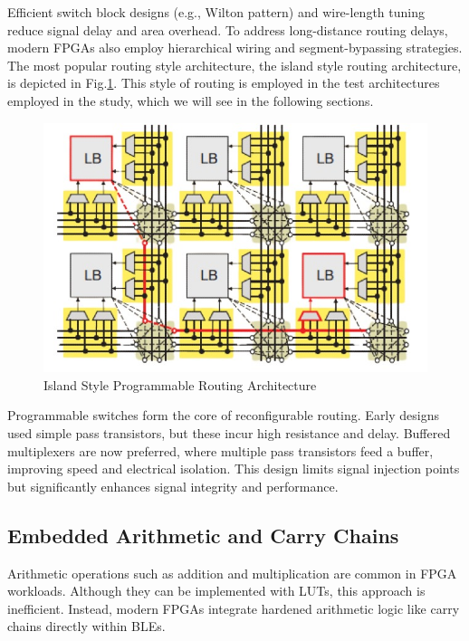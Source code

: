 Efficient switch block designs (e.g., Wilton pattern) and wire-length tuning reduce signal delay and area overhead\cite{funda-fpga-arch-4}. To address long-distance routing delays, modern FPGAs also employ hierarchical wiring and segment-bypassing strategies. The most popular routing style architecture, the island style routing architecture, is depicted in Fig.\ref{fig:island style routing architecture}. This style of routing is employed in the test architectures employed in the study, which we will see in the following sections.

\begin{figure}[H]
	\centerline{\includegraphics[scale = 0.6]{Figures/island_style_routing-removebg-preview.jpg}}
	\caption{Island Style Programmable Routing Architecture\cite{boutros2021fpga}}
	\label{fig:island style routing architecture}
\end{figure}

Programmable switches form the core of reconfigurable routing. Early designs used simple pass transistors, but these incur high resistance and delay\cite{funda-fpga-arch-5}. Buffered multiplexers are now preferred, where multiple pass transistors feed a buffer, improving speed and electrical isolation\cite{funda-fpga-arch-6}\cite{funda-fpga-arch-7}. This design limits signal injection points but significantly enhances signal integrity and performance.

\subsection{Embedded Arithmetic and Carry Chains}
Arithmetic operations such as addition and multiplication are common in FPGA workloads. Although they can be implemented with LUTs, this approach is inefficient. Instead, modern FPGAs integrate hardened arithmetic logic like carry chains directly within BLEs.

